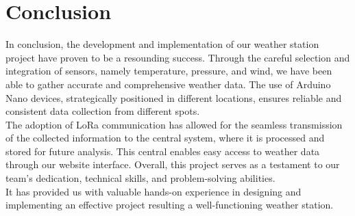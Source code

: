 \documentclass{article}
\newcounter{romancounter} %
\begin{document}
\section{Conclusion}
In conclusion, the development and implementation of our weather station project have proven to be a
resounding success. Through the careful selection and integration of sensors, namely temperature, pressure,
and wind, we have been able to gather accurate and comprehensive weather data. The use of Arduino Nano
devices, strategically positioned in different locations, ensures reliable and consistent data collection from
different spots. \\
The adoption of LoRa communication has allowed for the seamless transmission of the collected information to the
central system, where it is processed and stored for future analysis. This central enables easy access to 
weather data through our website interface.
Overall, this project serves as a testament to our team's dedication, technical skills, and problem-solving abilities. \\
It has provided us with valuable hands-on experience in designing and implementing an effective project resulting
a well-functioning weather station.


\cleardoublepage
\setcounter{page}{\theromancounter}

\printglossaries
{}
\end{document}
